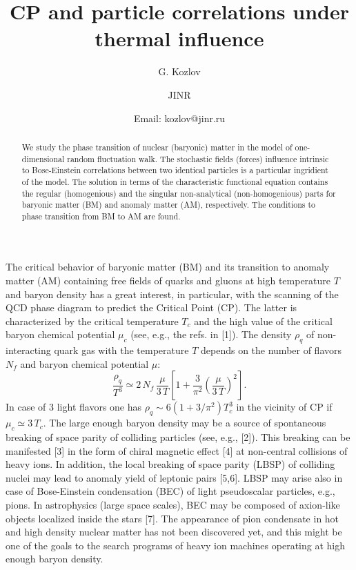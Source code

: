 \documentclass[WPCF,manyauthors]{wpcfTemplate}
\begin{document}
%
%
%
\begin{titlepage}
%
\title{ CP and particle correlations under thermal influence }
%
\author{G. Kozlov}
\author{
 JINR\\
}
\author{Email: kozlov@jinr.ru}
%
%
\begin{abstract}
We study the phase transition of nuclear (baryonic) matter in the model of one-dimensional random fluctuation walk. The stochastic fields (forces) influence intrinsic to Bose-Einstein correlations between two identical particles is a particular  ingridient of the model. The solution in terms of the characteristic functional equation contains the regular (homogenious)  and the singular non-analytical (non-homogenious) parts for baryonic matter (BM) and anomaly matter (AM), respectively.
The conditions to phase transition from BM to AM are found. 
\end{abstract}
\end{titlepage}
%
The critical behavior of baryonic matter (BM) and its transition to anomaly matter (AM) containing free fields of quarks and gluons at high temperature $T$ and baryon density  has a great interest, in particular, with the scanning of the QCD phase diagram to predict the Critical Point  (CP). The latter is characterized by the critical temperature $T_{c}$ and the high value of the critical baryon chemical potential $\mu_{c}$ (see, e.g., the refs. in [1]). The density $\rho_{q}$ of non-interacting quark gas with the temperature  $T$ depends on the number of flavors $N_{f}$ and baryon chemical potential $\mu$:
$$\frac{\rho_{q}}{T^{3}} \simeq 2\,N_{f}\,\frac{\mu}{3\,T}\left [ 1+ \frac{3}{\pi^{2}}\left (\frac{\mu}{3\,T}\right) ^{2}\right ].$$
In case of 3 light flavors one has $\rho_{q} \sim 6 (1 + 3/\pi^{2})T_{c}^{3}$ in the vicinity of CP if $\mu_{c}\simeq 3\,T_{c}$.
The large enough baryon density may be a source of spontaneous breaking of space parity of colliding particles (see, e.g., [2]). This breaking can be manifested [3] in the form of chiral magnetic effect [4] at non-central collisions of heavy ions. In addition, the local breaking of space parity (LBSP) of colliding nuclei may lead to anomaly yield of leptonic pairs [5,6]. LBSP may arise also in case of Bose-Einstein condensation (BEC) of light pseudoscalar particles, e.g., pions. %
In astrophysics (large space scales), BEC may be composed of axion-like objects localized inside the stars [7]. The appearance of pion condensate in hot and high density nuclear matter has not been discovered yet, and this might be one of the goals to the search programs of heavy ion machines operating at high enough baryon density.
\end{document}
